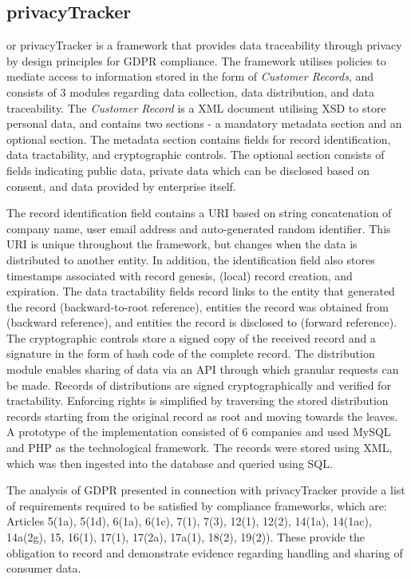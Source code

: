 \subsection{privacyTracker}
or privacyTracker \cite{gjermundrod_privacytracker:_2016} is a framework that provides data traceability through privacy by design principles for GDPR compliance. The framework utilises policies to mediate access to information stored in the form of \textit{Customer Records}, and consists of 3 modules regarding data collection, data distribution, and data traceability. The \textit{Customer Record} is a XML document utilising XSD to store personal data, and contains two sections - a mandatory metadata section and an optional section. The metadata section contains fields for record identification, data tractability, and cryptographic controls. The optional section consists of fields indicating public data, private data which can be disclosed based on consent, and data provided by enterprise itself.

The record identification field contains a URI based on string concatenation of company name, user email address and auto-generated random identifier. This URI is unique throughout the framework, but changes when the data is distributed to another entity. In addition, the identification field also stores timestamps associated with record genesis, (local) record creation, and expiration. The data tractability fields record links to the entity that generated the record (backward-to-root reference), entities the record was obtained from (backward reference), and entities the record is disclosed to (forward reference). The cryptographic controls store a signed copy of the received record and a signature in the form of hash code of the complete record.
The distribution module enables sharing of data via an API through which granular requests can be made. Records of distributions are signed cryptographically and verified for tractability.
Enforcing rights is simplified by traversing the stored distribution records starting from the original record as root and moving towards the leaves.
A prototype of the implementation consisted of 6 companies and used MySQL and PHP as the technological framework. The records were stored using XML, which was then ingested into the database and queried using SQL.

The analysis of GDPR presented in connection with privacyTracker provide a list of requirements required to be satisfied by compliance frameworks, which are: Articles 5(1a), 5(1d), 6(1a), 6(1c), 7(1), 7(3), 12(1), 12(2), 14(1a), 14(1ac), 14a(2g), 15, 16(1), 17(1), 17(2a), 17a(1), 18(2), 19(2)). These provide the obligation to record and demonstrate evidence regarding handling and sharing of consumer data. 


